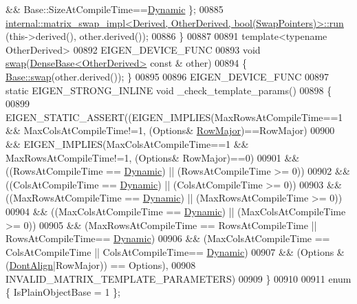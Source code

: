 \begin{DoxyCode}
       && Base::SizeAtCompileTime==\hyperlink{namespace_eigen_ad81fa7195215a0ce30017dfac309f0b2}{Dynamic} \};
00885       \hyperlink{struct_eigen_1_1internal_1_1matrix__swap__impl}{internal::matrix\_swap\_impl<Derived, OtherDerived, bool(SwapPointers)>::run}
      (this->derived(), other.derived());
00886     \}
00887     
00891     \textcolor{keyword}{template}<\textcolor{keyword}{typename} OtherDerived>
00892     EIGEN\_DEVICE\_FUNC
00893     \textcolor{keywordtype}{void} \hyperlink{endian_8c_a3ca5ecd34b04d6a243c054ac3a57f68d}{swap}(\hyperlink{group___core___module_class_eigen_1_1_dense_base}{DenseBase<OtherDerived>} \textcolor{keyword}{const} & other)
00894     \{ \hyperlink{endian_8c_a3ca5ecd34b04d6a243c054ac3a57f68d}{Base::swap}(other.derived()); \}
00895     
00896     EIGEN\_DEVICE\_FUNC 
00897     \textcolor{keyword}{static} EIGEN\_STRONG\_INLINE \textcolor{keywordtype}{void} \_check\_template\_params()
00898     \{
00899       EIGEN\_STATIC\_ASSERT((EIGEN\_IMPLIES(MaxRowsAtCompileTime==1 && MaxColsAtCompileTime!=1, (Options&
      \hyperlink{group__enums_ggaacded1a18ae58b0f554751f6cdf9eb13acfcde9cd8677c5f7caf6bd603666aae3}{RowMajor})==RowMajor)
00900                         && EIGEN\_IMPLIES(MaxColsAtCompileTime==1 && MaxRowsAtCompileTime!=1, (Options&
      RowMajor)==0)
00901                         && ((RowsAtCompileTime == \hyperlink{namespace_eigen_ad81fa7195215a0ce30017dfac309f0b2}{Dynamic}) || (RowsAtCompileTime >= 0))
00902                         && ((ColsAtCompileTime == \hyperlink{namespace_eigen_ad81fa7195215a0ce30017dfac309f0b2}{Dynamic}) || (ColsAtCompileTime >= 0))
00903                         && ((MaxRowsAtCompileTime == \hyperlink{namespace_eigen_ad81fa7195215a0ce30017dfac309f0b2}{Dynamic}) || (MaxRowsAtCompileTime >= 0))
00904                         && ((MaxColsAtCompileTime == \hyperlink{namespace_eigen_ad81fa7195215a0ce30017dfac309f0b2}{Dynamic}) || (MaxColsAtCompileTime >= 0))
00905                         && (MaxRowsAtCompileTime == RowsAtCompileTime || RowsAtCompileTime==
      \hyperlink{namespace_eigen_ad81fa7195215a0ce30017dfac309f0b2}{Dynamic})
00906                         && (MaxColsAtCompileTime == ColsAtCompileTime || ColsAtCompileTime==
      \hyperlink{namespace_eigen_ad81fa7195215a0ce30017dfac309f0b2}{Dynamic})
00907                         && (Options & (\hyperlink{group__enums_ggaacded1a18ae58b0f554751f6cdf9eb13a40a452614141522dd313363dbbd65726}{DontAlign}|RowMajor)) == Options),
00908         INVALID\_MATRIX\_TEMPLATE\_PARAMETERS)
00909     \}
00910 
00911     \textcolor{keyword}{enum} \{ IsPlainObjectBase = 1 \};

\end{DoxyCode}
